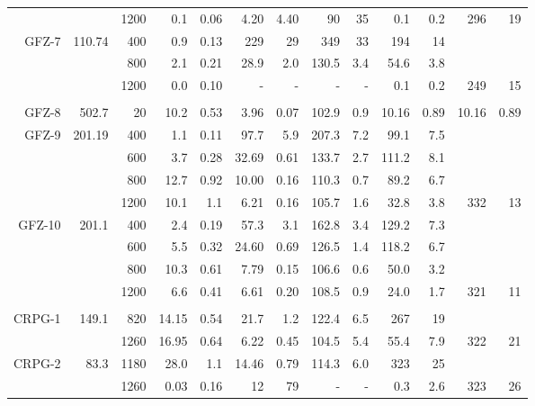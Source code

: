 \documentclass[authoryear,review,12pt]{elsarticle}
\begin{document}
\begin{table}
\begin{tabular}{|r|rrrrrrrrrrrr|}
          &       & 1200  & 0.1   & 0.06  & 4.20  & 4.40  & 90    & 35    & 0.1   & 0.2   & 296   & 19 \\
    GFZ-7 & 110.74 & 400   & 0.9   & 0.13  & 229   & 29    & 349   & 33    & 194   & 14    &       &  \\
          &       & 800   & 2.1   & 0.21  & 28.9  & 2.0   & 130.5 & 3.4   & 54.6  & 3.8   &       &  \\
          &       & 1200  & 0.0   & 0.10  & -     & -     & -     & -     & 0.1   & 0.2   & 249   & 15 \\
          &       &       &       &       &       &       &       &       &       &       &       &  \\
    GFZ-8 & 502.7 & 20 & 10.2  & 0.53  & 3.96  & 0.07  & 102.9 & 0.9   & 10.16 & 0.89  & 10.16 & 0.89 \\
    GFZ-9 & 201.19 & 400   & 1.1   & 0.11  & 97.7  & 5.9   & 207.3 & 7.2   & 99.1 & 7.5  &       &  \\
          &       & 600   & 3.7   & 0.28  & 32.69 & 0.61  & 133.7 & 2.7   & 111.2 & 8.1  &       &  \\
          &       & 800   & 12.7  & 0.92  & 10.00 & 0.16  & 110.3 & 0.7   & 89.2 & 6.7  &       &  \\
          &       & 1200  & 10.1  & 1.1   & 6.21  & 0.16  & 105.7 & 1.6   & 32.8 & 3.8  & 332   & 13 \\
    GFZ-10 & 201.1 & 400   & 2.4   & 0.19  & 57.3  & 3.1   & 162.8 & 3.4   & 129.2 & 7.3  &       &  \\
          &       & 600   & 5.5   & 0.32  & 24.60 & 0.69  & 126.5 & 1.4   & 118.2 & 6.7  &       &  \\
          &       & 800   & 10.3  & 0.61  & 7.79  & 0.15  & 106.6 & 0.6   & 50.0 & 3.2  &       &  \\
          &       & 1200  & 6.6   & 0.41  & 6.61  & 0.20  & 108.5 & 0.9   & 24.0 & 1.7  & 321   & 11 \\
          &       &       &       &       &       &       &       &       &       &       &       &  \\
    CRPG-1 & 149.1 & 820   & 14.15 & 0.54  & 21.7  & 1.2   & 122.4 & 6.5   & 267   & 19    &       &  \\
          &       & 1260  & 16.95 & 0.64  & 6.22  & 0.45  & 104.5 & 5.4   & 55.4  & 7.9   & 322   & 21 \\
    CRPG-2 & 83.3  & 1180  & 28.0  & 1.1   & 14.46 & 0.79  & 114.3 & 6.0   & 323   & 25    &       &  \\
          &       & 1260  & 0.03  & 0.16  & 12    & 79    & -     & -     & 0.3   & 2.6   & 323   & 26 \\
    \hline
    \end{tabular}
\end{table}
\end{document}

